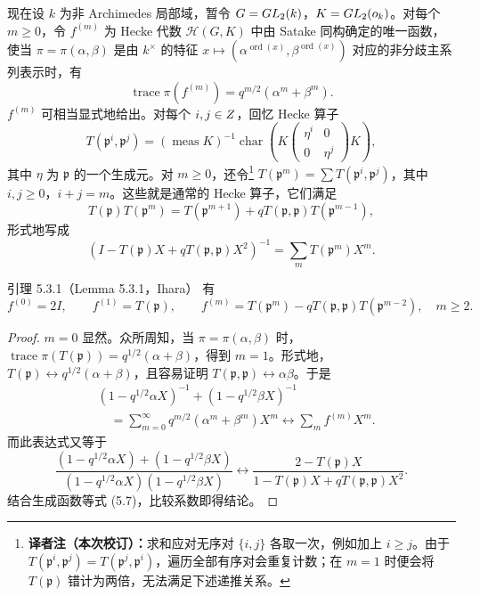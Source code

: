 现在设 $k$ 为非 Archimedes 局部域，暂令 $G=GL_2(k)$，$K=GL_2(o_k)$。对每个 $m\ge0$，令 $f^{(m)}$ 为 Hecke 代数 $\mathcal H(G,K)$ 中由 Satake 同构确定的唯一函数，使当 $\pi=\pi(\alpha,\beta)$ 是由 $k^\times$ 的特征 $x\mapsto(\alpha^{\operatorname{ord}(x)},\beta^{\operatorname{ord}(x)})$ 对应的非分歧主系列表示时，有
\[
 \operatorname{trace}\pi(f^{(m)})=q^{m/2}(\alpha^m+\beta^m).
\]
$f^{(m)}$ 可相当显式地给出。对每个 $i,j\in Z$，回忆 Hecke 算子
\[
 T(\mathfrak p^i,\mathfrak p^j)
 =(\operatorname{meas}K)^{-1}\operatorname{char}
 \left(K\begin{pmatrix}\eta^i&0\\0&\eta^j\end{pmatrix}K\right),
\]
其中 $\eta$ 为 $\mathfrak p$ 的一个生成元。对 $m\ge0$，还令\footnote{\textbf{译者注（本次校订）：}求和应对无序对 $\{i,j\}$ 各取一次，例如加上 $i\ge j$。由于 $T(\mathfrak p^i,\mathfrak p^j)=T(\mathfrak p^j,\mathfrak p^i)$，遍历全部有序对会重复计数；在 $m=1$ 时便会将 $T(\mathfrak p)$ 错计为两倍，无法满足下述递推关系。} $T(\mathfrak p^m)=\sum T(\mathfrak p^i,\mathfrak p^j)$，其中 $i,j\ge0$，$i+j=m$。这些就是通常的 Hecke 算子，它们满足
\[
 T(\mathfrak p)T(\mathfrak p^m)
 =T(\mathfrak p^{m+1})+qT(\mathfrak p,\mathfrak p)T(\mathfrak p^{m-1}),
\]
形式地写成
\begin{equation}
 (I-T(\mathfrak p)X+qT(\mathfrak p,\mathfrak p)X^2)^{-1}
 =\sum_mT(\mathfrak p^m)X^m.
 \tag{5.7}
\end{equation}

\begin{originaltheorem}{引理 5.3.1（Lemma 5.3.1，Ihara）}
有
\[
 f^{(0)}=2I,\qquad f^{(1)}=T(\mathfrak p),\qquad
 f^{(m)}=T(\mathfrak p^m)-qT(\mathfrak p,\mathfrak p)T(\mathfrak p^{m-2}),\quad m\ge2.
\]
\end{originaltheorem}

\begin{proof}
$m=0$ 显然。众所周知，当 $\pi=\pi(\alpha,\beta)$ 时，$\operatorname{trace}\pi(T(\mathfrak p))=q^{1/2}(\alpha+\beta)$，得到 $m=1$。形式地，$T(\mathfrak p)\leftrightarrow q^{1/2}(\alpha+\beta)$，且容易证明 $T(\mathfrak p,\mathfrak p)\leftrightarrow\alpha\beta$。于是
\[
 \begin{aligned}
 &(1-q^{1/2}\alpha X)^{-1}+(1-q^{1/2}\beta X)^{-1}\\
 &\quad=\sum_{m=0}^\infty q^{m/2}(\alpha^m+\beta^m)X^m
 \longleftrightarrow\sum_mf^{(m)}X^m.
 \end{aligned}
\]
而此表达式又等于
\[
 \frac{(1-q^{1/2}\alpha X)+(1-q^{1/2}\beta X)}
 {(1-q^{1/2}\alpha X)(1-q^{1/2}\beta X)}
 \longleftrightarrow
 \frac{2-T(\mathfrak p)X}{1-T(\mathfrak p)X+qT(\mathfrak p,\mathfrak p)X^2}.
\]
结合生成函数等式 (5.7)，比较系数即得结论。
\end{proof}

